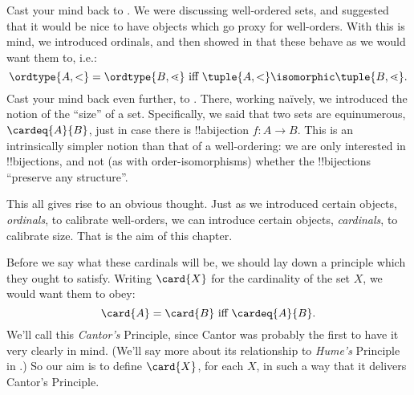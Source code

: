 \documentclass[../../../include/open-logic-section]{subfiles}
\begin{document}

Cast your mind back to . We were discussing
well-ordered sets, and suggested that it would be nice to have objects
which go proxy for well-orders. With this is mind, we introduced
ordinals, and then showed in
 that these
behave as we would want them to, i.e.:
\[
	\ordtype{A, <} = \ordtype{B, \lessdot} 
	\text{ iff } \tuple{A, <} \isomorphic \tuple{B, \lessdot}.
\]
Cast your mind back even further, to .
There, working na\"ively, we introduced the notion of the ``size'' of
a set. Specifically, we said that two sets are equinumerous,
$\cardeq{A}{B}$, just in case there is !!a{bijection} $f \colon A \to
B$. This is an intrinsically {simpler} notion than that of a
well-ordering: we are only interested in !!{bijection}s, and not (as
with order-isomorphisms) whether the !!{bijection}s ``preserve any
structure''.

This all gives rise to an obvious thought. Just as we introduced
certain objects, \emph{ordinals}, to calibrate well-orders, we can
introduce certain objects, \emph{cardinals}, to calibrate size. That
is the aim of this chapter. 

Before we say what these cardinals will be, we should lay down a
principle which they ought to satisfy. Writing $\card{X}$ for the
cardinality of the set $X$, we would want them to obey:
\[
	\card{A} = \card{B} \text{ iff } \cardeq{A}{B}.
\]
We'll call this \emph{Cantor's} Principle, since Cantor was probably
the first to have it very clearly in mind. (We'll say more about its
relationship to \emph{Hume's} Principle in .) So
our aim is to define $\card{X}$, for each $X$, in such a way that it
delivers Cantor's Principle.
\end{document}
